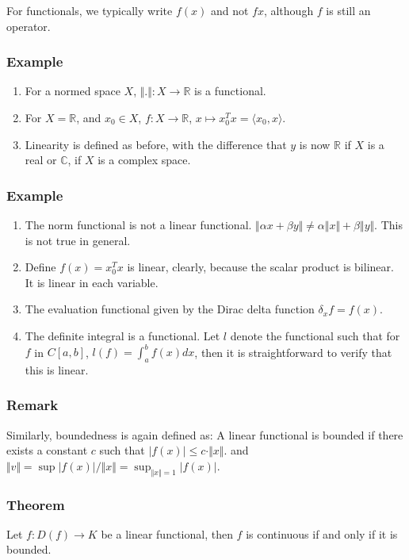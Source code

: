 \documentclass[11pt]{article}
\def\R{\mathbb{R}}
\def\C{\mathbb{C}}
\begin{document}
For functionals, we typically write \(f(x)\) and not \(fx\), although \(f\) is
still an operator.
\subsubsection{Example}
\label{sec:org89a2e83}
\begin{enumerate}
\item For a normed space \(X\), \(\Vert . \Vert \colon X \rightarrow \R\) is a functional.
\item For \(X=\R\), and \(x_0 \in X\), \(f\colon X\rightarrow \R\), \(x\mapsto x_0^{T}x
       = \langle x_0, x\rangle\).
\item Linearity is defined as before, with the difference that \(y\) is now \(\R\)
if \(X\) is a real or \(\C\), if \(X\) is a complex space.
\end{enumerate}
\subsubsection{Example}
\label{sec:orgd266da3}
\begin{enumerate}
\item The norm functional is not a linear functional. \(\Vert \alpha x + \beta y
       \Vert \neq \alpha \Vert x \Vert + \beta \Vert y \Vert\). This is not true
in general.
\item Define \(f(x) = x_0^{T}x\) is linear, clearly, because the scalar product
is bilinear. It is linear in each variable.
\item The evaluation functional given by the Dirac delta function \(\delta_x f =
       f(x)\).
\item The definite integral is a functional. Let \(l\) denote the functional such
that for \(f\) in \(C[a, b]\), \(l(f) = \int_{a}^{b} f(x) dx\), then it is
straightforward to verify that this is linear.
\end{enumerate}
\subsubsection{Remark}
\label{sec:org94cad0e}
Similarly, boundedness is again defined as: A linear functional is bounded
if there exists a constant \(c\) such that \(\vert f(x) \vert \le c \cdot \Vert
    x \Vert\). and \(\Vert v \Vert = \sup \vert f(x) \vert / \Vert x \Vert =
    \sup_{\Vert x \Vert = 1} \vert f(x) \vert\).
\subsubsection{Theorem}
\label{sec:org03abda7}
Let \(f\colon D(f) \rightarrow K\) be a linear functional, then \(f\) is
continuous if and only if it is bounded.
\end{document}
